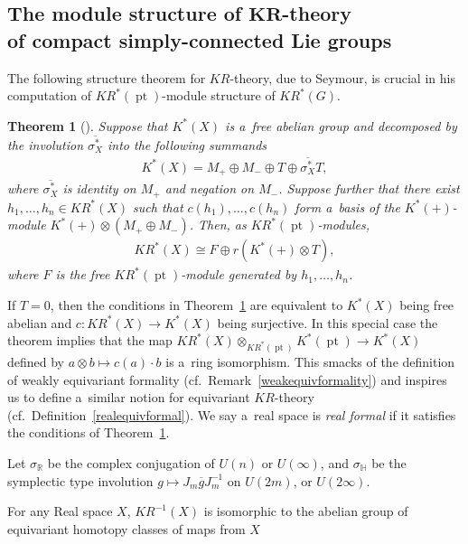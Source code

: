 \documentclass[11pt]{article}
\numberwithin{equation}{section}
\newtheorem{Theorem}{Theorem}[section]
\DeclareMathOperator{\pt}{pt}
\begin{document}
\subsection[The module structure of $KR$-theory of compact simply-connected Lie groups]{The
module structure of $\boldsymbol{KR}$-theory\\ of compact simply-connected Lie groups}
The following structure theorem for $KR$-theory, due to Seymour, is crucial in his computation of
$KR^*(\pt)$-module structure of $KR^*(G)$.
\begin{Theorem}[{\cite[Theorem 4.2]{Se}}]\label{strthm}
Suppose that $K^*(X)$ is a~free abelian group and decomposed by the involution $\overline{\sigma_X^*}$ into the following summands
\begin{gather*}
K^*(X)=M_+\oplus M_-\oplus T\oplus \overline{\sigma_X^*}T,
\end{gather*}
where $\overline{\sigma_X^*}$ is identity on $M_+$ and negation on $M_-$.
Suppose further that there exist $h_1, \dots, h_n\in KR^*(X)$ such that $c(h_1), \dots, c(h_n)$ form a~basis of the
$K^*(+)$-module $K^*(+)\otimes(M_+\oplus M_-)$.
Then, as $KR^*(\pt)$-modules,
\begin{gather*}
KR^*(X)\cong F\oplus r(K^*(+)\otimes T),
\end{gather*}
where $F$ is the free $KR^*(\pt)$-module generated by $h_1, \dots, h_n$.
\end{Theorem}
\begin{Remark}
If $T=0$, then the conditions in Theorem~\ref{strthm} are equivalent to $K^*(X)$ being free abelian and $c: KR^*(X)\to
K^*(X)$ being surjective.
In this special case the theorem
implies that the map $KR^*(X)\otimes_{KR^*(\pt)}K^*(\pt)\to K^*(X)$ def\/ined
by $a\otimes b\mapsto c(a)\cdot b$ is a~ring isomorphism.
This smacks of the def\/inition of weakly equivariant formality (cf.\ Remark~\ref{weakequivformality}) and inspires us to
def\/ine a~similar notion for equivariant $KR$-theory (cf.\ Def\/inition~\ref{realequivformal}).
We say a~real space is \emph{real formal} if it satisf\/ies the conditions of Theorem~\ref{strthm}.
\end{Remark}
\begin{Definition}
Let $\sigma_\mathbb{R}$ be the complex conjugation of $U(n)$ or $U(\infty)$,
and $\sigma_\mathbb{H}$ be the symplectic type involution $g\mapsto J_m\overline{g}J_m^{-1}$ on $U(2m)$, or $U(2\infty)$.
\end{Definition}
For any Real space $X$, $KR^{-1}(X)$ is isomorphic to the abelian group of equivariant homotopy classes of maps from $X$
\end{document}
